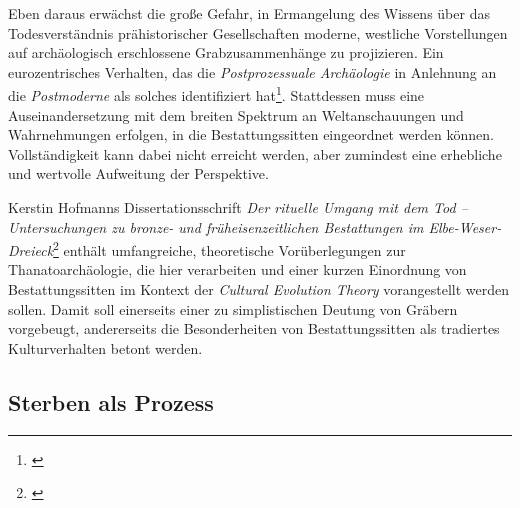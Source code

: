 \documentclass[openany,twoside,twocolumn]{book}
\let\rmarkdownfootnote\footnote%
\def\footnote{\protect\rmarkdownfootnote}
\begin{document}
Eben daraus erwächst die große Gefahr, in Ermangelung des Wissens über
das Todesverständnis prähistorischer Gesellschaften moderne, westliche
Vorstellungen auf archäologisch erschlossene Grabzusammenhänge zu
projizieren. Ein eurozentrisches Verhalten, das die
\emph{Postprozessuale Archäologie} in Anlehnung an die
\emph{Postmoderne} als solches identifiziert hat\footnote{\textcite{atalay_indigenous_2006}}.
Stattdessen muss eine Auseinandersetzung mit dem breiten Spektrum an
Weltanschauungen und Wahrnehmungen erfolgen, in die Bestattungssitten
eingeordnet werden können. Vollständigkeit kann dabei nicht erreicht
werden, aber zumindest eine erhebliche und wertvolle Aufweitung der
Perspektive.

Kerstin Hofmanns Dissertationsschrift \emph{Der rituelle Umgang mit dem
Tod -- Untersuchungen zu bronze- und früheisenzeitlichen Bestattungen im
Elbe-Weser-Dreieck}\footnote{\textcite{hofmann_rituelle_2008}} enthält
umfangreiche, theoretische Vorüberlegungen zur Thanatoarchäologie, die
hier verarbeiten und einer kurzen Einordnung von Bestattungssitten im
Kontext der \emph{Cultural Evolution Theory} vorangestellt werden
sollen. Damit soll einerseits einer zu simplistischen Deutung von
Gräbern vorgebeugt, andererseits die Besonderheiten von
Bestattungssitten als tradiertes Kulturverhalten betont werden.

\hypertarget{sterben-als-prozess}{%
\subsection{Sterben als Prozess}\label{sterben-als-prozess}}
\end{document}
